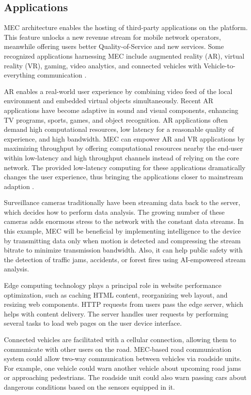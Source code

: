 \subsection{Applications}
\label{subs:applications}

MEC architecture enables the hosting of third-party applications on the platform. This feature unlocks a new revenue stream for mobile network operators, meanwhile offering users better Quality-of-Service and new services. Some recognized applications harnessing MEC include augmented reality (AR), virtual reality (VR), gaming, video analytics, and connected vehicles with Vehicle-to-everything communication \cite{Sprecher2020}.

AR enables a real-world user experience by combining video feed of the local environment and embedded virtual objects simultaneously. Recent AR applications have become adaptive in sound and visual components, enhancing TV programs, sports, games, and object recognition. AR applications often demand high computational resources, low latency for a reasonable quality of experience, and high bandwidth. MEC can empower AR and VR applications by maximizing throughput by offering computational resources nearby the end-user within low-latency and high throughput channels instead of relying on the core network. The provided low-latency computing for these applications dramatically changes the user experience, thus bringing the applications closer to mainstream adaption \cite{Sprecher2020}. \cite{Abbas2018}

Surveillance cameras traditionally have been streaming data back to the server, which decides how to perform data analysis. The growing number of these cameras adds enormous stress to the network with the constant data streams. In this example, MEC will be beneficial by implementing intelligence to the device by transmitting data only when motion is detected and compressing the stream bitrate to minimize transmission bandwidth. Also, it can help public safety with the detection of traffic jams, accidents, or forest fires using AI-empowered stream analysis.

Edge computing technology plays a principal role in website performance optimization, such as caching HTML content, reorganizing web layout, and resizing web components. HTTP requests from users pass the edge server, which helps with content delivery. The server handles user requests by performing several tasks to load web pages on the user device interface. \cite{Abbas2018}

Connected vehicles are facilitated with a cellular connection, allowing them to communicate with other users on the road. MEC-based road communication system could allow two-way communication between vehicles via roadside units. For example, one vehicle could warn another vehicle about upcoming road jams or approaching pedestrians. The roadside unit could also warn passing cars about dangerous conditions based on the sensors equipped in it. \cite{Abbas2018}

